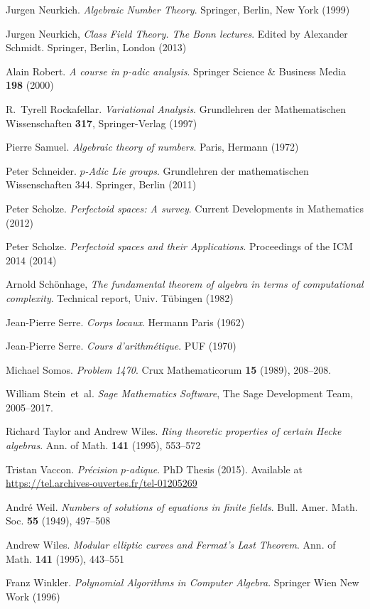 \documentclass[11pt]{article}
\numberwithin{equation}{section}
\numberwithin{figure}{section}
\theoremstyle{definition}
\begin{document}
\begin{thebibliography}{99}
  Jurgen Neurkich.
  \emph{Algebraic Number Theory}.
  Springer, Berlin, New York (1999)

  Jurgen Neurkich,
  \emph{Class Field Theory. The Bonn lectures}.
  Edited by Alexander Schmidt. Springer, Berlin, London (2013)

  Alain Robert.
  \emph{A course in $p$-adic analysis}.
  Springer Science \& Business Media \textbf{198} (2000)

  R.~Tyrell Rockafellar.
  \emph{Variational Analysis}.
  Grundlehren der Mathematischen Wissenschaften \textbf{317}, Springer-Verlag
  (1997)

  Pierre Samuel.
  \emph{Algebraic theory of numbers}.
  Paris, Hermann (1972)

  Peter Schneider.
  \emph{$p$-Adic Lie groups}.
  {Grundlehren der mathematischen Wissenschaften 344}. Springer,
  Berlin (2011)

  Peter Scholze.
  \emph{Perfectoid spaces: A survey}.
  Current Developments in Mathematics (2012)

  Peter Scholze.
  \emph{Perfectoid spaces and their Applications}.
  Proceedings of the ICM 2014 (2014)

  Arnold Schönhage,
  \emph{The fundamental theorem of algebra in terms of computational complexity}.
  Technical report, Univ. Tübingen (1982)

  Jean-Pierre Serre.
  \emph{Corps locaux}.
  Hermann Paris (1962)

  Jean-Pierre Serre.
  \emph{Cours d'arithmétique}.
  PUF (1970)

  Michael Somos.
  \emph{Problem 1470}.
  {Crux Mathematicorum} \textbf{15} (1989), 208--208.

  William Stein~et~al.
  \emph{Sage Mathematics Software},
  The Sage Development Team, {2005--2017}.

  Richard Taylor and Andrew Wiles.
  \emph{Ring theoretic properties of certain Hecke algebras}.
  Ann. of Math. \textbf{141} (1995), 553--572

  Tristan Vaccon.
  \emph{Précision $p$-adique}.
  PhD Thesis (2015). Available at \url{https://tel.archives-ouvertes.fr/tel-01205269}

  André Weil.
  \emph{Numbers of solutions of equations in finite fields}.
  Bull. Amer. Math. Soc. \textbf{55} (1949), 497--508

  Andrew Wiles.
  \emph{Modular elliptic curves and Fermat's Last Theorem}.
  Ann. of Math. \textbf{141} (1995), 443--551

  Franz Winkler.
  \emph{Polynomial Algorithms in Computer Algebra}.
  Springer Wien New Work (1996)
\end{thebibliography}
\end{document}
